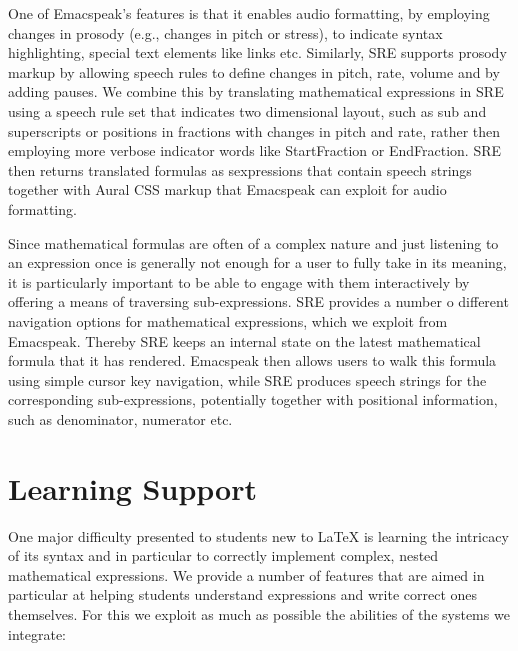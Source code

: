 \documentclass{sig-alternate-05-2015}
\newcommand{\sre}{SRE\xspace}
\begin{document}
One of Emacspeak's features is that it enables audio formatting, by employing
changes in prosody (e.g., changes in pitch or stress), to indicate syntax
highlighting, special text elements like links etc. Similarly, \sre supports
prosody markup by allowing speech rules to define changes in pitch, rate, volume
and by adding pauses. We combine this by translating mathematical expressions in
\sre using a speech rule set that indicates two dimensional layout, such as sub
and superscripts or positions in fractions with changes in pitch and rate,
rather then employing more verbose indicator words like StartFraction or
EndFraction. \sre then returns translated formulas as sexpressions that contain
speech strings together with Aural CSS markup that Emacspeak can exploit for
audio formatting.


Since mathematical formulas are often of a complex nature and just listening to
an expression once is generally not enough for a user to fully take in its
meaning, it is particularly important to be able to engage with them
interactively by offering a means of traversing sub-expressions.  \sre provides
a number o different navigation options for mathematical expressions, which we
exploit from Emacspeak. Thereby \sre keeps an internal state on the latest
mathematical formula that it has rendered. Emacspeak then allows users to walk
this formula using simple cursor key navigation, while \sre produces speech
strings for the corresponding sub-expressions, potentially together with
positional information, such as denominator, numerator etc.



\section{Learning Support}
\label{sec:learning-features}

One major difficulty presented to students new to {\LaTeX} is learning the
intricacy of its syntax and in particular to correctly implement complex, nested
mathematical expressions.  We provide a number of features that are aimed in
particular at helping students understand expressions and write correct ones
themselves. For this we exploit as much as possible the abilities of the systems
we integrate:
\end{document}
